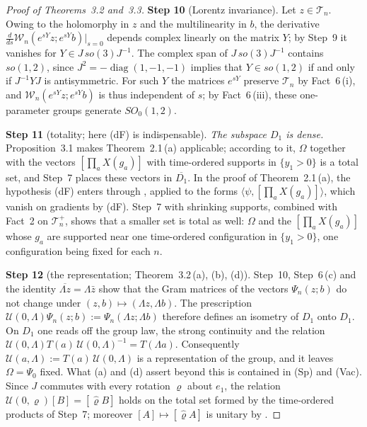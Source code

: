 \documentclass[11pt]{amsart}
\theoremstyle{definition}
\begin{document}
\begin{proof}[Proof of Theorems~3.2 and~3.3]
\textbf{Step 10} (Lorentz invariance).
Let $z\in\mathcal T_n$.
Owing to the holomorphy in $z$ and the multilinearity in $b$, the derivative $\frac d{ds}\mathcal W_n(e^{sY}z;e^{sY}b)|_{s=0}$ depends complex linearly on the matrix $Y$; by Step~9 it vanishes for $Y\in J\,so(3)J^{-1}$.
The complex span of $J\,so(3)J^{-1}$ contains $so(1,2)$, since $J^2=-\operatorname{diag}(1,-1,-1)$ implies that $Y\in so(1,2)$ if and only if $J^{-1}YJ$ is antisymmetric.
For such $Y$ the matrices $e^{sY}$ preserve $\mathcal T_n$ by Fact~6\,(i), and $\mathcal W_n(e^{sY}z;e^{sY}b)$ is thus independent of $s$; by Fact~6\,(iii), these one-parameter groups generate $SO_0(1,2)$.

\textbf{Step 11} (totality; here (dF) is indispensable).
\emph{The subspace $D_1$ is dense.}
Proposition~3.1 makes Theorem~2.1\,(a) applicable; according to it, $\Omega$ together with the vectors $[\prod_aX(g_a)]$ with time-ordered supports in $\{y_1>0\}$ is a total set, and Step~7 places these vectors in $\overline{D_1}$.
In the proof of Theorem~2.1\,(a), the hypothesis (dF) enters through \cite[Proposition~14.13]{QEDII}, applied to the forms $\langle\psi,[\prod_aX(g_a)]\rangle$, which vanish on gradients by (dF).
Step~7 with shrinking supports, combined with Fact~2 on $\mathcal T_n^+$, shows that a smaller set is total as well: $\Omega$ and the $[\prod_aX(g_a)]$ whose $g_a$ are supported near one time-ordered configuration in $\{y_1>0\}$, one configuration being fixed for each $n$.

\textbf{Step 12} (the representation; Theorem~3.2\,(a), (b), (d)).
Step~10, Step~6\,(c) and the identity $\overline{\Lambda z}=\Lambda\bar z$ show that the Gram matrices of the vectors $\Psi_n(z;b)$ do not change under $(z,b)\mapsto(\Lambda z,\Lambda b)$.
The prescription $\mathcal U(0,\Lambda)\Psi_n(z;b):=\Psi_n(\Lambda z;\Lambda b)$ therefore defines an isometry of $D_1$ onto $D_1$.
On $D_1$ one reads off the group law, the strong continuity and the relation $\mathcal U(0,\allowbreak \Lambda)T(a)\,\allowbreak \mathcal U(0,\allowbreak \Lambda)^{-1}=\allowbreak T(\Lambda a)$.
Consequently $\mathcal U(a,\Lambda):=T(a)\,\mathcal U(0,\Lambda)$ is a representation of the group, and it leaves $\Omega=\Psi_0$ fixed.
What (a) and (d) assert beyond this is contained in (Sp) and (Vac).
Since $J$ commutes with every rotation $\varrho$ about $e_1$, the relation $\mathcal U(0,\varrho)[B]=[\hat\varrho B]$ holds on the total set formed by the time-ordered products of Step~7; moreover $[A]\mapsto[\hat\varrho A]$ is unitary by \cite[Proposition~14.47\,(a)]{QEDII}.


\end{proof}
\end{document}
